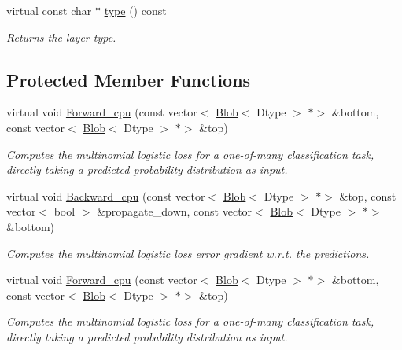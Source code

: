 \begin{DoxyCompactItemize}
\mbox{\label{classcaffe_1_1_multinomial_logistic_loss_layer_a024d90a0acee12dbec6c640fe709d5ea}} 
virtual const char $\ast$ \mbox{\hyperlink{classcaffe_1_1_multinomial_logistic_loss_layer_a024d90a0acee12dbec6c640fe709d5ea}{type}} () const
\begin{DoxyCompactList}\small\item\em Returns the layer type. \end{DoxyCompactList}\end{DoxyCompactItemize}
\subsection*{Protected Member Functions}
\begin{DoxyCompactItemize}
\item 
virtual void \mbox{\hyperlink{classcaffe_1_1_multinomial_logistic_loss_layer_a7192a16a5b051f93d784be269d7bfcb3}{Forward\+\_\+cpu}} (const vector$<$ \mbox{\hyperlink{classcaffe_1_1_blob}{Blob}}$<$ Dtype $>$ $\ast$$>$ \&bottom, const vector$<$ \mbox{\hyperlink{classcaffe_1_1_blob}{Blob}}$<$ Dtype $>$ $\ast$$>$ \&top)
\begin{DoxyCompactList}\small\item\em Computes the multinomial logistic loss for a one-\/of-\/many classification task, directly taking a predicted probability distribution as input. \end{DoxyCompactList}\item 
virtual void \mbox{\hyperlink{classcaffe_1_1_multinomial_logistic_loss_layer_a817e9cb16c4af367edf6941f6009a74d}{Backward\+\_\+cpu}} (const vector$<$ \mbox{\hyperlink{classcaffe_1_1_blob}{Blob}}$<$ Dtype $>$ $\ast$$>$ \&top, const vector$<$ bool $>$ \&propagate\+\_\+down, const vector$<$ \mbox{\hyperlink{classcaffe_1_1_blob}{Blob}}$<$ Dtype $>$ $\ast$$>$ \&bottom)
\begin{DoxyCompactList}\small\item\em Computes the multinomial logistic loss error gradient w.\+r.\+t. the predictions. \end{DoxyCompactList}\item 
virtual void \mbox{\hyperlink{classcaffe_1_1_multinomial_logistic_loss_layer_a92a355f79ca6d47741712f85fd79ab97}{Forward\+\_\+cpu}} (const vector$<$ \mbox{\hyperlink{classcaffe_1_1_blob}{Blob}}$<$ Dtype $>$ $\ast$$>$ \&bottom, const vector$<$ \mbox{\hyperlink{classcaffe_1_1_blob}{Blob}}$<$ Dtype $>$ $\ast$$>$ \&top)
\begin{DoxyCompactList}\small\item\em Computes the multinomial logistic loss for a one-\/of-\/many classification task, directly taking a predicted probability distribution as input. \end{DoxyCompactList}\item 

\end{DoxyCompactItemize}

